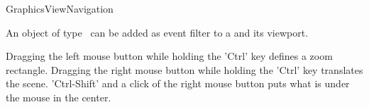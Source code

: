 \begin{ccRefClass}[Qt::]{GraphicsViewNavigation}

\ccDefinition
An object of type \ccRefName\ can be added as event filter to a  and its viewport.

Dragging the left mouse button while holding the 'Ctrl' key defines a zoom rectangle.
Dragging the right mouse button while holding the 'Ctrl' key translates the scene.
'Ctrl-Shift' and a click of the right mouse button puts what is under the mouse in the center.




\ccOperations



\end{ccRefClass}







